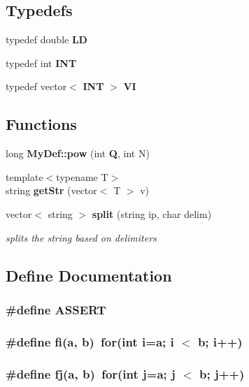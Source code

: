 \subsection*{Typedefs}
\begin{CompactItemize}
\item 
typedef double {\bf LD}
\item 
typedef int {\bf INT}
\item 
typedef vector$<$ {\bf INT} $>$ {\bf VI}
\end{CompactItemize}
\subsection*{Functions}
\begin{CompactItemize}
\item 
long {\bf MyDef::pow} (int {\bf Q}, int N)
\item 
{\footnotesize template$<$typename T$>$ }\\string {\bf getStr} (vector$<$ T $>$ v)
\item 
vector$<$ string $>$ {\bf split} (string ip, char delim)
\begin{CompactList}\small\item\em splits the string based on delimiters \item\end{CompactList}\end{CompactItemize}


\subsection{Define Documentation}
\subsubsection{\setlength{\rightskip}{0pt plus 5cm}\#define ASSERT}\label{main_8h_4459b092466ded0e5f9cdb3deb455b35}


\subsubsection{\setlength{\rightskip}{0pt plus 5cm}\#define fi(a, b)~for(int i=a; i $<$ b; i++)}\label{main_8h_52a1e7e2d18c42a4a0085150dbced269}


\subsubsection{\setlength{\rightskip}{0pt plus 5cm}\#define fj(a, b)~for(int j=a; j $<$ b; j++)}\label{main_8h_325d6bffebbbb57f697dbb5825723b50}


